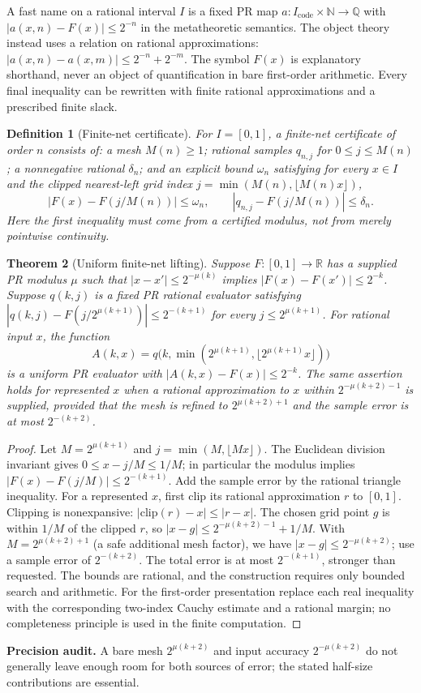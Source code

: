 \documentclass[11pt]{article}
\newtheorem{theorem}{Theorem}[section]
\newtheorem{definition}[theorem]{Definition}
\newcommand{\Q}{\mathbb Q}\newcommand{\N}{\mathbb N}\newcommand{\ipra}{\mathrm{iPRA}}
\begin{document}
A fast name on a rational interval $I$ is a fixed PR map $a:I_\mathrm{code}\times\N\to\Q$ with $|a(x,n)-F(x)|\le 2^{-n}$ in the metatheoretic semantics. The object theory instead uses a relation on rational approximations: $|a(x,n)-a(x,m)|\le2^{-n}+2^{-m}$. The symbol $F(x)$ is explanatory shorthand, never an object of quantification in bare first-order arithmetic. Every final inequality can be rewritten with finite rational approximations and a prescribed finite slack.

\begin{definition}[Finite-net certificate]
For $I=[0,1]$, a finite-net certificate of order $n$ consists of: a mesh $M(n)\ge1$; rational samples $q_{n,j}$ for $0\le j\le M(n)$; a nonnegative rational $\delta_n$; and an explicit bound $\omega_n$ satisfying for every $x\in I$ and the clipped nearest-left grid index $j=\min(M(n),\lfloor M(n)x\rfloor)$,
\[
|F(x)-F(j/M(n))|\le\omega_n,\qquad |q_{n,j}-F(j/M(n))|\le\delta_n.
\]
Here the first inequality must come from a certified modulus, not from merely pointwise continuity.
\end{definition}

\begin{theorem}[Uniform finite-net lifting]\label{thm:net}
Suppose $F:[0,1]\to\mathbb R$ has a supplied PR modulus $\mu$ such that $|x-x'|\le2^{-\mu(k)}$ implies $|F(x)-F(x')|\le2^{-k}$. Suppose $q(k,j)$ is a fixed PR rational evaluator satisfying
$|q(k,j)-F(j/2^{\mu(k+1)})|\le2^{-(k+1)}$ for every $j\le2^{\mu(k+1)}$.
For rational input $x$, the function
\[
A(k,x)=q\bigl(k,\min(2^{\mu(k+1)},\lfloor 2^{\mu(k+1)}x\rfloor)\bigr)
\]
is a uniform PR evaluator with $|A(k,x)-F(x)|\le2^{-k}$. The same assertion holds for represented $x$ when a rational approximation to $x$ within $2^{-\mu(k+2)-1}$ is supplied, provided that the mesh is refined to $2^{\mu(k+2)+1}$ and the sample error is at most $2^{-(k+2)}$.
\end{theorem}
\begin{proof}
Let $M=2^{\mu(k+1)}$ and $j=\min(M,\lfloor Mx\rfloor)$. The Euclidean division invariant gives $0\le x-j/M\le 1/M$; in particular the modulus implies $|F(x)-F(j/M)|\le2^{-(k+1)}$. Add the sample error by the rational triangle inequality. For a represented $x$, first clip its rational approximation $r$ to $[0,1]$. Clipping is nonexpansive: $|\mathrm{clip}(r)-x|\le|r-x|$. The chosen grid point $g$ is within $1/M$ of the clipped $r$, so $|x-g|\le2^{-\mu(k+2)-1}+1/M$. With $M=2^{\mu(k+2)+1}$ (a safe additional mesh factor), we have $|x-g|\le2^{-\mu(k+2)}$; use a sample error of $2^{-(k+2)}$. The total error is at most $2^{-(k+1)}$, stronger than requested. The bounds are rational, and the construction requires only bounded search and arithmetic. For the first-order presentation replace each real inequality with the corresponding two-index Cauchy estimate and a rational margin; no completeness principle is used in the finite computation.
\end{proof}
\noindent\textbf{Precision audit.} A bare mesh $2^{\mu(k+2)}$ and input accuracy $2^{-\mu(k+2)}$ do not generally leave enough room for both sources of error; the stated half-size contributions are essential.
\end{document}
